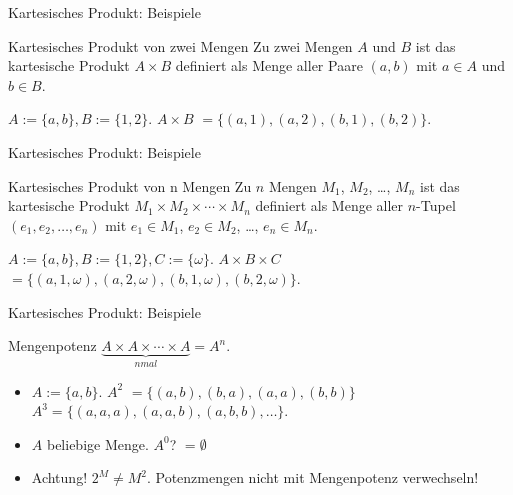 \documentclass{beamer}
\begin{document}
\begin{frame}{Kartesisches Produkt: Beispiele}
	\begin{block}{Kartesisches Produkt von zwei Mengen}
		Zu zwei Mengen $A$ und $B$ ist das kartesische Produkt $A \times B$ definiert als Menge aller Paare $(a, b)$ mit $a \in A$ und $b \in B$.
	\end{block}
	 
	
	$A := \{a, b\}, B := \{1, 2\}$.   $A \times B$   $ = \{(a, 1), (a, 2), (b, 1), (b, 2)\}$.
\end{frame}

\begin{frame}{Kartesisches Produkt: Beispiele}
	
	\begin{block}{Kartesisches Produkt von n Mengen}
		Zu $n$ Mengen $M_1$, $M_2$, \dots, $M_n$   ist das kartesische Produkt $M_1 \times M_2 \times \cdots \times M_n$   definiert als Menge aller $n$-Tupel $(e_1, e_2, \dots, e_n)$   mit $e_1 \in M_1$, $e_2 \in M_2$, \dots, $e_n \in M_n$.
	\end{block} 
	
	$A := \{a, b\}, B := \{1, 2\}, C:= \{\omega\}$. $A \times B \times C$   $ = \{(a, 1, \omega), (a, 2, \omega), (b, 1, \omega), (b, 2, \omega) \}$.
	
\end{frame}

\begin{frame}{Kartesisches Produkt: Beispiele}
	
	\begin{block}{Mengenpotenz}
		$\underbrace{A \times A \times \cdots \times A}_{n mal} = A^n$.
	\end{block} 
	
	\begin{itemize}
		\item $A := \{a, b\}$.   $A^2$   $ = \{(a, b), (b, a), (a, a), (b, b)\}$   $A^3 = \{(a, a, a), (a, a, b), (a, b, b), \dots\}$.
		\item $A$ beliebige Menge.   $A^0$?   $ = \emptyset$ 
		\item Achtung! $2^M \neq M^2$.   Potenzmengen nicht mit Mengenpotenz verwechseln!
	\end{itemize}
	
\end{frame}
\end{document}
